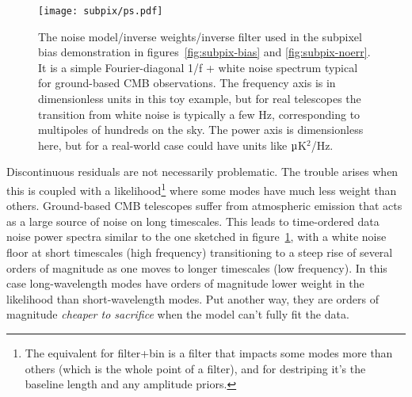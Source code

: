 \documentclass[twocolumn,apj]{aastex63}
\begin{document}
\begin{figure}
	\centering
	\hspace*{-2mm}\texttt{[image: subpix/ps.pdf]}
	\caption{
		The noise model/inverse weights/inverse filter used in the subpixel
		bias demonstration in figures~\ref{fig:subpix-bias} and \ref{fig:subpix-noerr}.
		It is a simple Fourier-diagonal 1/f + white noise spectrum
		typical for ground-based CMB observations. The frequency axis is in
		dimensionless units in this toy example, but for real telescopes the
		transition from white noise is typically a few Hz, corresponding
		to multipoles of hundreds on the sky. The power axis is dimensionless
		here, but for a real-world case could have units like $\micro$K$^2$/Hz.
	}
	\label{fig:ps}
\end{figure}

Discontinuous residuals are not necessarily problematic. The trouble arises
when this is coupled with a likelihood\footnote{The equivalent for filter+bin is a filter that
impacts some modes more than others (which is the whole point of a filter),
and for destriping it's the baseline length and any amplitude priors.
} where some modes have much less weight than others. Ground-based CMB
telescopes suffer from atmospheric emission that acts as a large source
of noise on long timescales. This leads to time-ordered data noise power
spectra similar to the one sketched in figure~\ref{fig:ps}, with
a white noise floor at short timescales (high frequency) transitioning to a steep
rise of several orders of magnitude as one moves to longer timescales
(low frequency). In this case long-wavelength modes have orders of magnitude
lower weight in the likelihood than short-wavelength modes. Put another way,
they are orders of magnitude \emph{cheaper to sacrifice} when the model can't fully
fit the data.
\end{document}
